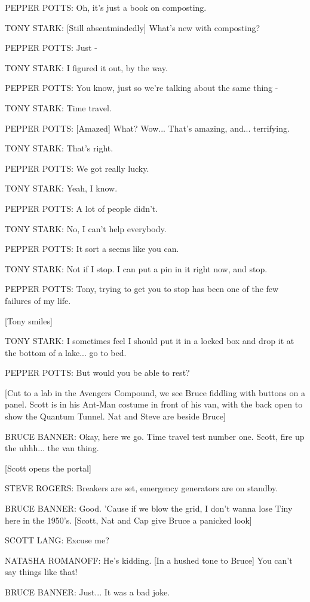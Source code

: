 PEPPER POTTS: Oh, it's just a book on composting.

TONY STARK: [Still absentmindedly] What's new with composting?

PEPPER POTTS: Just -

TONY STARK: I figured it out, by the way.

PEPPER POTTS: You know, just so we're talking about the same thing -

TONY STARK: Time travel.

PEPPER POTTS: [Amazed] What? Wow... That's amazing, and... terrifying.

TONY STARK: That's right.

PEPPER POTTS: We got really lucky.

TONY STARK: Yeah, I know.

PEPPER POTTS: A lot of people didn't.

TONY STARK: No, I can't help everybody.

PEPPER POTTS: It sort a seems like you can.

TONY STARK: Not if I stop. I can put a pin in it right now, and stop.

PEPPER POTTS: Tony, trying to get you to stop has been one of the few failures of my life.

[Tony smiles]

TONY STARK: I sometimes feel I should put it in a locked box and drop it at the bottom of a lake... go to bed.

PEPPER POTTS: But would you be able to rest?

[Cut to a lab in the Avengers Compound, we see Bruce fiddling with buttons on a panel. Scott is in his Ant-Man costume in front of his van, with the back open to show the Quantum Tunnel. Nat and Steve are beside Bruce]

BRUCE BANNER: Okay, here we go. Time travel test number one. Scott, fire up the uhhh... the van thing.

[Scott opens the portal]

STEVE ROGERS: Breakers are set, emergency generators are on standby.

BRUCE BANNER: Good. 'Cause if we blow the grid, I don't wanna lose Tiny here in the 1950's. [Scott, Nat and Cap give Bruce a panicked look]

SCOTT LANG: Excuse me?

NATASHA ROMANOFF: He's kidding. [In a hushed tone to Bruce] You can't say things like that!

BRUCE BANNER: Just... It was a bad joke.

